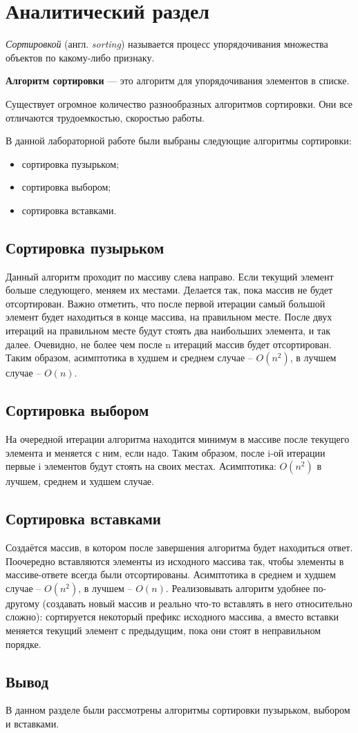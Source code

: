 \chapter{Аналитический раздел}

\textit{Сортировкой} (англ. \textit{sorting}) называется процесс упорядочивания множества объектов по какому-либо признаку.

\textbf{Алгоритм сортировки} — это алгоритм для упорядочивания элементов в списке.

Существует огромное количество разнообразных алгоритмов сортировки. Они все отличаются трудоемкостью, скоростью работы.

В данной лабораторной работе были выбраны следующие алгоритмы сортировки:

\begin{itemize}
	\item сортировка пузырьком;
	\item сортировка выбором;
	\item сортировка вставками.
\end{itemize}

\section{Сортировка пузырьком}
Данный алгоритм проходит по массиву слева направо. Если текущий элемент больше следующего, меняем их местами. Делается так, пока массив не будет отсортирован. Важно отметить, что после первой итерации самый большой элемент будет находиться в конце массива, на правильном месте. После двух итераций на правильном месте будут стоять два наибольших элемента, и так далее. Очевидно, не более чем после n итераций массив будет отсортирован. Таким образом, асимптотика в худшем и среднем случае – $O(n^2)$, в лучшем случае – $O(n)$. \cite{teoriya}

\section{Сортировка выбором}
На очередной итерации алгоритма находится минимум в массиве после текущего элемента и меняется с ним, если надо. Таким образом, после i-ой итерации первые i элементов будут стоять на своих местах. Асимптотика: $O(n^2)$ в лучшем, среднем и худшем случае. \cite{teoriya}

\section{Сортировка вставками}
Создаётся массив, в котором после завершения алгоритма будет находиться ответ. Поочередно вставляются элементы из исходного массива так, чтобы элементы в массиве-ответе всегда были отсортированы. Асимптотика в среднем и худшем случае – $O(n^2)$, в лучшем – $O(n)$. Реализовывать алгоритм удобнее по-другому (создавать новый массив и реально что-то вставлять в него относительно сложно): сортируется некоторый префикс исходного массива, а вместо вставки меняется текущий элемент с предыдущим, пока они стоят в неправильном порядке. \cite{teoriya}

\section{Вывод}
В данном разделе были рассмотрены алгоритмы сортировки пузырьком, выбором и вставками.